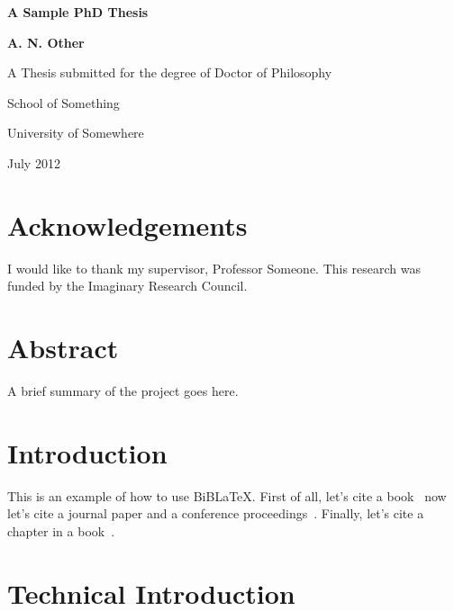 \documentclass[oneside,12pt]{scrbook}
\theoremstyle{break}
\begin{document}
\begin{titlepage}
\centering
\vspace*{1in}
\begin{Large}\bfseries
A Sample PhD Thesis\par
\end{Large}
\vspace{1.5in}
\begin{large}\bfseries
A. N. Other\par
\end{large}
\vfill
A Thesis submitted for the degree of Doctor of Philosophy
\par
\vspace{0.5in}
School of Something
\par
University of Somewhere
\par
\vspace{0.5in}
July 2012
\par
\end{titlepage}

\doublespacing

\frontmatter
\tableofcontents
\listoffigures
\listoftables
\lstlistoflistings

\chapter{Acknowledgements}

I would like to thank my supervisor, Professor Someone. This
research was funded by the Imaginary Research Council.

\chapter{Abstract}

A brief summary of the project goes here.

\mainmatter

\chapter{Introduction}
\label{ch:intro}

This is an example of how to use BiB\LaTeX.
First of all, let's cite a book~\cite{wainwright93}
now let's cite a journal paper and a conference
proceedings~\cite{cawley96,talbot97}.
Finally, let's cite a chapter in a book~\cite[Chapter 9]{goossens97}.


\chapter{Technical Introduction}
\label{ch:techintro}
\end{document}
